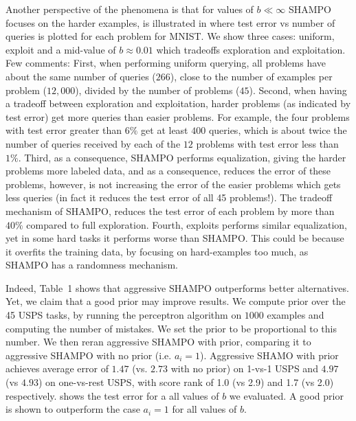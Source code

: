 Another perspective of the phenomena is that for values of $b\ll \infty$ SHAMPO focuses on the harder 
examples, is illustrated in  where test error vs number of queries is plotted for each 
problem for MNIST. We show three cases: uniform, exploit and a mid-value of $b\approx 0.01$ which 
tradeoffs exploration and exploitation. Few comments: First, when performing uniform querying, all 
problems have about the same number of queries ($266$), close to the number of examples per problem 
($12,000$), divided by the number of problems ($45$). Second, when having a tradeoff between exploration 
and exploitation, harder problems (as indicated by test error) get more queries than easier problems. 
For example, the four problems with test error greater than $6\%$ get at least $400$ queries, which is 
about twice the number of queries received by each of the $12$ problems with test error less than $1\%$. 
Third, as a consequence, SHAMPO performs equalization, giving the harder problems more labeled data, 
and as a consequence, reduces the error of these problems, however, is not increasing the error of the 
easier problems which gets less queries (in fact it reduces the test error of all 45 problems!). 
The tradeoff mechanism of SHAMPO, reduces the test error of each problem by more than $40\%$ 
compared to full exploration. Fourth, exploits performs similar equalization, yet in some hard tasks it 
performs worse than SHAMPO. This could be because it overfits the training data, by focusing on 
hard-examples too much, as SHAMPO has a randomness mechanism.


Indeed, Table~1 shows that aggressive SHAMPO outperforms better alternatives. Yet, we claim that a 
good prior may improve results. We compute prior over the 45 USPS tasks, by running the perceptron 
algorithm on $1000$ examples and computing the number of mistakes.  
We set the prior to be proportional to this number. We then reran aggressive SHAMPO with prior, 
comparing it to aggressive SHAMPO with no prior (i.e. $a_i=1$). 
Aggressive SHAMO with prior achieves average error of $1.47$ (vs. $2.73$ with no prior) on 1-vs-1 USPS 
and $4.97$ (vs $4.93$) on one-vs-rest USPS, with score rank of 1.0 (vs 2.9) and 1.7 (vs 2.0) respectively.
 shows the test error for a all values of $b$ we evaluated. 
A good prior is shown to outperform the case $a_i=1$ for all values of $b$.


